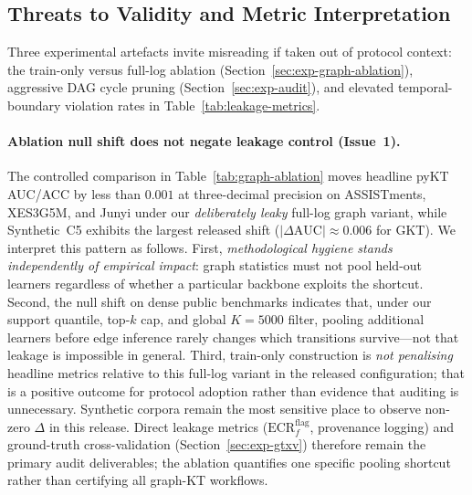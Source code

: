 \documentclass[runningheads]{llncs}
\begin{document}
\subsection{Threats to Validity and Metric Interpretation}
\label{sec:threats-validity}
Three experimental artefacts invite misreading if taken out of protocol
context: the train-only versus full-log ablation (Section~\ref{sec:exp-graph-ablation}),
aggressive DAG cycle pruning (Section~\ref{sec:exp-audit}), and elevated
temporal-boundary violation rates in Table~\ref{tab:leakage-metrics}.

\paragraph{Ablation null shift does not negate leakage control (Issue~1).}
The controlled comparison in Table~\ref{tab:graph-ablation} moves headline
pyKT AUC/ACC by less than $0.001$ at three-decimal precision on
ASSISTments, XES3G5M, and Junyi under our \emph{deliberately leaky}
full-log graph variant, while Synthetic~C5 exhibits the largest released
shift ($|\Delta\text{AUC}|{\approx}0.006$ for GKT).
We interpret this pattern as follows.
First, \emph{methodological hygiene stands independently of empirical
impact}: graph statistics must not pool held-out learners regardless of
whether a particular backbone exploits the shortcut.
Second, the null shift on dense public benchmarks indicates that, under
our support quantile, top-$k$ cap, and global $K{=}5000$ filter, pooling
additional learners before edge inference rarely changes which transitions
survive---not that leakage is impossible in general.
Third, train-only construction is \emph{not penalising} headline metrics
relative to this full-log variant in the released configuration; that is a
positive outcome for protocol adoption rather than evidence that auditing
is unnecessary.
Synthetic corpora remain the most sensitive place to observe non-zero
$\Delta$ in this release.
Direct leakage metrics ($\mathrm{ECR}^{\mathrm{flag}}_f$, provenance
logging) and ground-truth cross-validation (Section~\ref{sec:exp-gtxv})
therefore remain the primary audit deliverables; the ablation quantifies
one specific pooling shortcut rather than certifying all graph-KT workflows.
\end{document}
